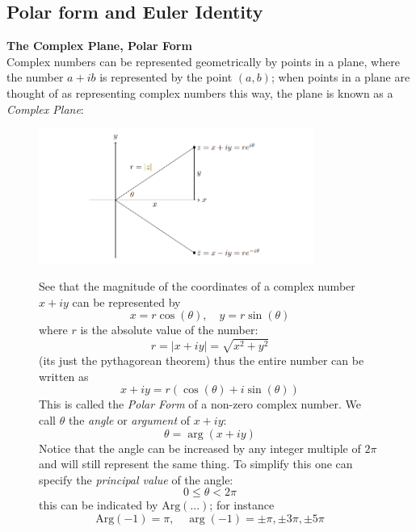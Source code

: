 \documentclass{report}
\begin{document}
\subsection{Polar form and Euler Identity}%
\textbf{The Complex Plane, Polar Form}\\
Complex numbers can be represented geometrically by points in a plane, where the number $a+ib$ is represented by 
the point $(a,b)$; when points in a plane are thought of as representing complex numbers this way,
the plane is known as a \textit{Complex Plane}:
\begin{figure}[h]
\begin{center}
\includegraphics[width=9cm]{8}\\
\end{center}
See that the magnitude of the coordinates of a complex number $x+iy$ can be represented by
\begin{equation*}
x=r\cos(\theta),\quad y=r\sin(\theta)
\end{equation*}
where $r$ is the absolute value of the number:
\begin{equation*}
r=|x+iy|=\sqrt{x^2+y^2}
\end{equation*}
(its just the pythagorean theorem) thus the entire number
can be written as
\begin{equation*}
x+iy=r(\cos(\theta)+i\sin(\theta))
\end{equation*}
This is called the \textit{Polar Form}
of a non-zero complex number. We call $\theta$ the \textit{angle} or
\textit{argument} of $x+iy$:
\begin{equation*}
\theta=\arg(x+iy)
\end{equation*}
Notice that the angle can be increased by any integer multiple of $2\pi$ and will still represent the same thing. 
To simplify this one can specify the \textit{principal value} of the angle:
\begin{equation*}
0\leq\theta<2\pi
\end{equation*}
this can be indicated by $\text{Arg}(...)$; for instance
\begin{equation*}
\text{Arg}(-1)=\pi,\quad\arg(-1)=\pm\pi,\pm3\pi,\pm5\pi
\end{equation*}
\end{figure}\\
\end{document}
